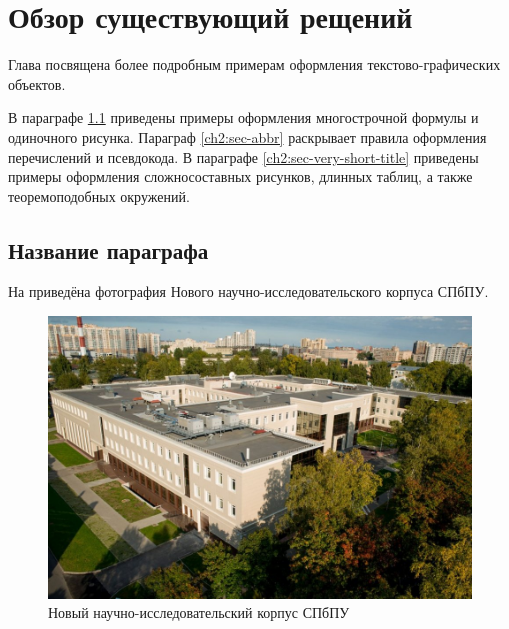 \chapter{Обзор существующий рещений} \label{ch2}
	

Глава посвящена более подробным примерам оформления текстово-графических объектов.

В параграфе \ref{ch2:title-abbr} приведены примеры оформления многострочной формулы и одиночного рисунка. Параграф \ref{ch2:sec-abbr} раскрывает правила оформления перечислений и псевдокода. В параграфе \ref{ch2:sec-very-short-title} приведены примеры оформления сложносоставных рисунков, длинных таблиц, а также теоремоподобных окружений.


\section{Название параграфа} \label{ch2:title-abbr} %





На  приведёна фотография Нового научно-исследовательского корпуса СПбПУ.

	\begin{figure}[ht] 
	\center
	\includegraphics [scale=0.27] {my_folder/images/spbpu_new_bld_autumn}
	\caption{Новый научно-исследовательский корпус СПбПУ \cite{spbpu-gallery}} 
	\label{fig:spbpu-new-bld-autumn-ch2}  
	\end{figure}
	



